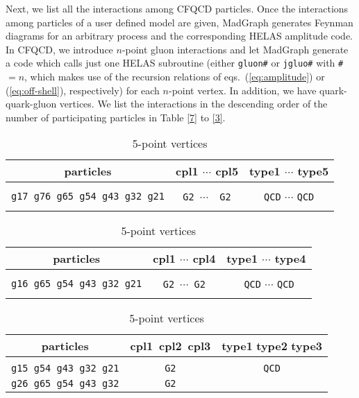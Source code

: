 Next, we list all the interactions among CFQCD particles. Once the
 interactions
 among particles of a
user defined model are given, MadGraph generates Feynman diagrams for an arbitrary
process and the corresponding HELAS amplitude code. In CFQCD, we
introduce $n$-point gluon interactions and let MadGraph
generate a code which calls just one HELAS subroutine (either {\tt gluon\#}
or {\tt jgluo\#} with {\tt \#} $=n$, which makes use of the recursion relations of
eqs.~(\ref{eq:amplitude}) or (\ref{eq:off-shell}), respectively) for each
 $n$-point vertex. In addition, we have
 quark-quark-gluon vertices. We list the interactions in the descending order of the
 number of participating particles in Table \ref{7} to \ref{3}.
\begin{table}
\centering
{\scriptsize
\caption{\normalsize 7-point vertices}
\label{7}
\begin{tabular}{ccc}
\hline
\hline
particles&cpl1 $\cdots$ cpl5&type1 $\cdots$ type5\\
\hline\\
 {\tt g17 g76 g65 g54 g43 g32 g21}&{\tt G2}\;\, $\cdots$\;\, {\tt
     G2}&{\tt QCD}\;\; $\cdots$\;\; {\tt QCD}\\\\
\hline
\hline
\end{tabular}
\vspace{2em}
\caption{\normalsize 6-point vertices}
\label{6}
\begin{tabular}{ccc}
\hline
\hline
particles&cpl1 $\cdots$ cpl4&type1 $\cdots$ type4\\
\hline\\
{\tt g16 g65 g54 g43 g32 g21}&{\tt G2}\;\, $\cdots$\;\, {\tt G2}& {\tt
	 QCD}\;\; $\cdots$\;\; {\tt QCD}\\\\
\hline
\hline
\end{tabular}
\vspace{2em}
\caption{\normalsize 5-point vertices}
\label{5}
\begin{tabular}{ccc}
\hline
\hline
particles&cpl1\, cpl2\, cpl3&type1\,\,type2\,\,type3\\
\hline\\
{\tt g15 g54 g43 g32 g21}&{\tt G2}\hspace{1.2em}{\tt
     G2}\hspace{1.2em}{\tt G2}&{\tt QCD}\hspace{1.2em}{\tt
	 QCD}\hspace{1.2em}{\tt QCD}\\
{\tt g26 g65 g54 g43 g32}&{\tt G2}\hspace{1.2em}{\tt
}
\end{tabular}}
\end{table}
